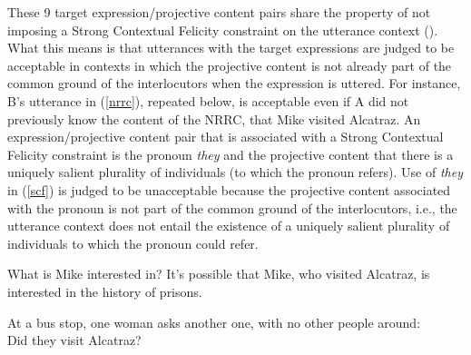\documentclass[11pt,fleqn]{article}
\newcommand{\6}{\mbox{$[\hspace*{-.6mm}[$}}
\newcommand{\9}{\mbox{$]\hspace*{-.6mm}]$}}
\def\infelic{{\leavevmode\llap{\#}}}
\begin{document}
These 9 target expression/projective content pairs share the property of not imposing a Strong Contextual Felicity constraint on the utterance context (\citealt{brst-lang11}). What this means is that utterances with the target expressions are judged to be acceptable in contexts in which the projective content is not already part of the common ground of the interlocutors when the expression is uttered. For instance, B's utterance in (\ref{nrrc}), repeated below, is acceptable even if A did not previously know the content of the NRRC, that Mike visited Alcatraz. An expression/projective content pair that is associated with a Strong Contextual Felicity constraint is the pronoun {\em they} and the projective content that there is a uniquely salient plurality of individuals (to which the pronoun refers). Use of {\em they} in (\ref{scf}) is judged to be unacceptable because the projective content associated with the pronoun is not part of the common ground of the interlocutors, i.e., the utterance context does not entail the existence of a uniquely salient plurality of individuals to which the pronoun could refer. 

\begin{exe}
\exi{(\ref{nrrc})}
\begin{xlist}
 What is Mike interested in?
 It's possible that Mike, who visited Alcatraz, is interested in the history of prisons.
\end{xlist}

\ex\label{scf} At a bus stop, one woman asks another one, with no other people around: \\ \infelic Did they visit Alcatraz?
\end{exe}
\end{document}
